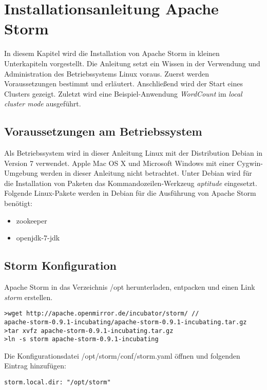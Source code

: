 \section{Installationsanleitung Apache Storm}
\label{sec:storminstall}


In diesem Kapitel wird die Installation von Apache Storm in kleinen Unterkapiteln vorgestellt. Die Anleitung setzt ein Wissen in der Verwendung und Administration des Betriebssystems Linux voraus. Zuerst werden Voraussetzungen bestimmt und erläutert. Anschließend wird der Start eines Clusters gezeigt. Zuletzt wird eine Beispiel-Anwendung \textit{WordCount} im \textit{local cluster mode} ausgeführt.


\subsection{Voraussetzungen am Betriebssystem}

Als Betriebssystem wird in dieser Anleitung Linux mit der Distribution Debian in Version 7 verwendet. Apple Mac OS X und Microsoft Windows mit einer Cygwin-Umgebung werden in dieser Anleitung nicht betrachtet. Unter Debian wird für die Installation von Paketen das Kommandozeilen-Werkzeug \textit{aptitude} eingesetzt.
Folgende Linux-Pakete werden in Debian für die Ausführung von Apache Storm benötigt:

\begin{itemize}
	\item zookeeper
	\item openjdk-7-jdk	
\end{itemize}


\subsection{Storm Konfiguration}

Apache Storm in das Verzeichnis /opt herunterladen, entpacken und einen Link \textit{storm} erstellen.
\begin{verbatim}
>wget http://apache.openmirror.de/incubator/storm/ //
apache-storm-0.9.1-incubating/apache-storm-0.9.1-incubating.tar.gz
>tar xvfz apache-storm-0.9.1-incubating.tar.gz
>ln -s storm apache-storm-0.9.1-incubating
\end{verbatim}

Die Konfigurationsdatei /opt/storm/conf/storm.yaml öffnen und folgenden Eintrag hinzufügen:
\begin{verbatim}
storm.local.dir: "/opt/storm"
\end{verbatim}


